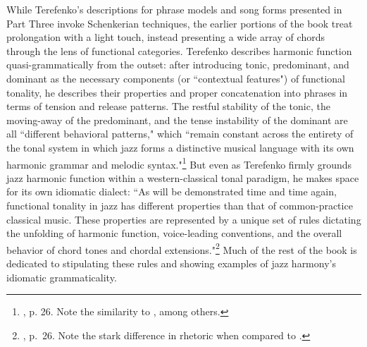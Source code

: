 While Terefenko's descriptions for phrase models and song forms presented in Part Three invoke Schenkerian techniques, the earlier portions of the book treat prolongation with a light touch, instead presenting a wide array of chords through the lens of functional categories.  Terefenko describes harmonic function quasi-grammatically from the outset:  after introducing tonic, predominant, and dominant as the necessary components (or ``contextual features") of functional tonality, he describes their properties and proper concatenation into phrases in terms of tension and release patterns.  The restful stability of the tonic, the moving-away of the predominant, and the tense instability of the dominant are all ``different behavioral patterns," which ``remain constant across the entirety of the tonal system in which jazz forms a distinctive musical language with its own harmonic grammar and melodic syntax."\footnote{\cite{terefenko2014}, p. 26.  Note the similarity to \cite{coker1964}, among others.}  But even as Terefenko firmly grounds jazz harmonic function within a western-classical tonal paradigm, he makes space for its own idiomatic dialect: ``As will be demonstrated time and time again, functional tonality in jazz has different properties than that of common-practice classical music.  These properties are represented by a unique set of rules dictating the unfolding of harmonic function, voice-leading conventions, and the overall behavior of chord tones and chordal extensions."\footnote{\cite{terefenko2014}, p.\ 26.  Note the stark difference in rhetoric when compared to \cite{mehegan1959}.}  Much of the rest of the book is dedicated to stipulating these rules and showing examples of jazz harmony's idiomatic grammaticality.

